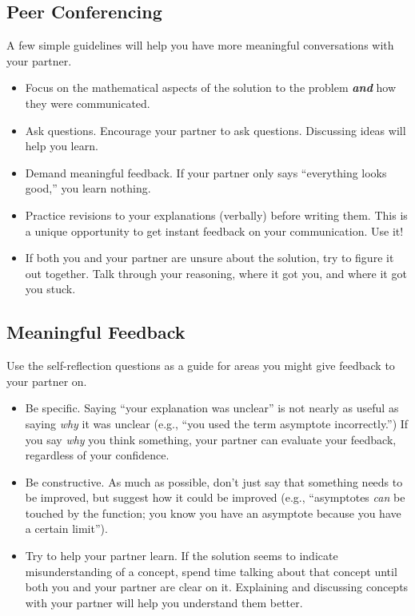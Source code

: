 \documentclass[letter]{article}
\begin{document}
	\subsection*{Peer Conferencing}
		A few simple guidelines will help you have more meaningful conversations with your partner.
	\begin{itemize}
		\item Focus on the mathematical aspects of the solution
		to the problem \emph{\textbf{and}} how they were communicated.

		\item Ask questions. Encourage your partner to ask
		questions. Discussing ideas will help you learn.

		\item Demand meaningful feedback. If your partner only
		says ``everything looks good,'' you learn nothing.

		\item Practice revisions to your explanations (verbally)
		before writing them. This is a unique opportunity to
		get instant feedback on your communication. Use it!

		\item If both you and your partner are unsure about the
		solution, try to figure it out together. Talk through your
		reasoning, where it got you, and where it got you stuck.
	\end{itemize}

	\subsection*{Meaningful Feedback}
		Use the self-reflection questions as a guide for areas you might give feedback to your partner on.
	\begin{itemize}
		\item Be specific. Saying ``your explanation was
			unclear'' is not nearly as useful as saying \emph{why} it
		was unclear (e.g., ``you used the term asymptote
		incorrectly.'') If you say \emph{why} you think something,
		your partner can evaluate your feedback, regardless of
		your confidence.

		\item Be constructive. As much as possible, don't just
		say that something needs to be improved, but suggest how
		it could be improved (e.g., ``asymptotes \emph{can} be touched
		by the function; you know you have an asymptote because
		you have a certain limit'').

		\item Try to help your partner learn. If the solution
		seems to indicate misunderstanding of a concept, spend
		time talking about that concept until both you and your
		partner are clear on it. Explaining and discussing
		concepts with your partner will help you understand
		them better.
	\end{itemize}
\end{document}
